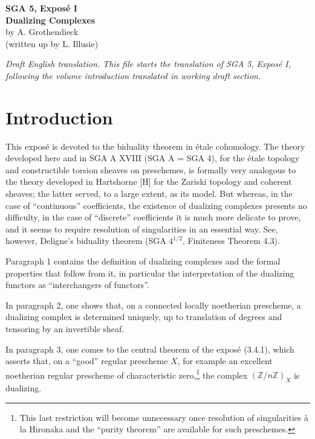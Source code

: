 \documentclass[11pt,a4paper]{article}
\newcommand{\Z}{\mathbb{Z}}
\theoremstyle{plain}
\theoremstyle{definition}
\begin{document}
\begin{center}
{\Large\textbf{SGA 5, Exposé I}}\\[0.35em]
{\Large\textbf{Dualizing Complexes}}\\[0.35em]
by A. Grothendieck\\
(written up by L. Illusie)
\end{center}

\bigskip

\noindent\textit{Draft English translation. This file starts the translation of SGA 5, Exposé I, following the volume introduction translated in working draft section.}

\section*{Introduction}

This exposé is devoted to the biduality theorem in étale cohomology. The theory developed here and in SGA A XVIII (SGA A = SGA 4), for the étale topology and constructible torsion sheaves on preschemes, is formally very analogous to the theory developed in Hartshorne [H] for the Zariski topology and coherent sheaves; the latter served, to a large extent, as its model. But whereas, in the case of ``continuous'' coefficients, the existence of dualizing complexes presents no difficulty, in the case of ``discrete'' coefficients it is much more delicate to prove, and it seems to require resolution of singularities in an essential way. See, however, Deligne's biduality theorem (SGA $4^{1/2}$, Finiteness Theorem 4.3).

Paragraph 1 contains the definition of dualizing complexes and the formal properties that follow from it, in particular the interpretation of the dualizing functors as ``interchangers of functors''.

In paragraph 2, one shows that, on a connected locally noetherian prescheme, a dualizing complex is determined uniquely, up to translation of degrees and tensoring by an invertible sheaf.

In paragraph 3, one comes to the central theorem of the exposé (3.4.1), which asserts that, on a ``good'' regular prescheme $X$, for example an excellent noetherian regular prescheme of characteristic zero,\footnote{This last restriction will become unnecessary once resolution of singularities à la Hironaka and the ``purity theorem'' are available for such preschemes.} the complex $(\Z/n\Z)_X$ is dualizing.
\end{document}
